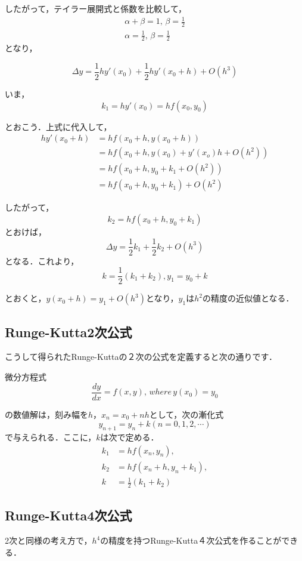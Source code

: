 \documentclass[11pt]{article}
\begin{document}
したがって，テイラー展開式と係数を比較して， \[
\begin{aligned}
\alpha + \beta = 1, \, \beta = \frac{1}{2}\\
\alpha = \frac{1}{2}, \, \beta =\frac{1}{2}
\end{aligned}\] となり，

\[
\Delta y = \frac{1}{2}hy'(x_0) + \frac{1}{2}hy'(x_0+h)+O(h^3)
\]

いま， \[
k_1 =hy'(x_0) =hf(x_0,y_0)
\]

とおこう．上式に代入して， \[
\begin{aligned}
hy'(x_0+h) &= hf(x_0+h,y(x_0+h)) \\
& =hf(x_0+h, y(x_0)+y'(x_o)h+O(h^2)) \\
& =hf(x_0+h, y_0+k_1+O(h^2)) \\
& =hf(x_0+h, y_0+k_1)+O(h^2)
\end{aligned}\]

したがって， \[
k_2 = hf(x_0+h, y_0+k_1)
\] とおけば， \[
\Delta y = \frac{1}{2}k_1 + \frac{1}{2}k_2 + O(h^3)
\] となる．これより， \[
k = \frac{1}{2}(k_1+k_2), y_1 = y_0 +k
\]

とおくと，\(y(x_0+h) = y_1+O(h^3)\)となり，\(y_1\)は\(h^2\)の精度の近似値となる．

    \subsection{Runge-Kutta2次公式}\label{runge-kutta2ux6b21ux516cux5f0f}

こうして得られたRunge-Kuttaの２次の公式を定義すると次の通りです．

微分方程式 \[
\frac{dy}{dx} = f(x,y), \, where \, y(x_0)=y_0
\]

の数値解は，刻み幅を\(h\)，\(x_n=x_0+nh\)として，次の漸化式 \[
y_{n+1} = y_n +k (n=0,1,2,\cdots)
\] で与えられる．ここに，\(k\)は次で定める． \[
\begin{aligned}
k_1 & = hf(x_n,y_n), \\
k_2 & = hf(x_n+h, y_n+k_1), \\
k & = \frac{1}{2}(k_1+k_2)
\end{aligned}
\]

    \subsection{Runge-Kutta4次公式}\label{runge-kutta4ux6b21ux516cux5f0f}

2次と同様の考え方で，\(h^4\)の精度を持つRunge-Kutta４次公式を作ることができる．
\end{document}
